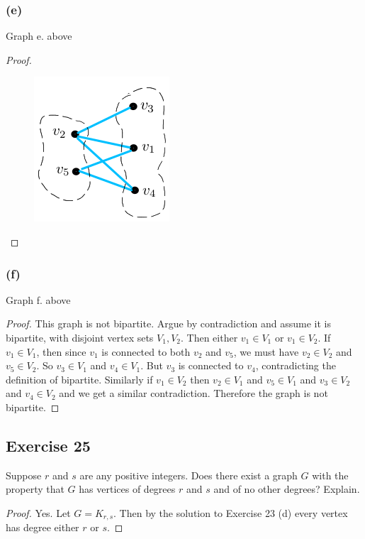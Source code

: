 \documentclass[14pt]{extarticle}
\begin{document}
\subsubsection{(e)}
Graph e. above

\begin{proof}
\begin{figure}[ht!]
\centering
\includegraphics[scale=0.4]{../images/4.9.24.e.png}
\end{figure}
\end{proof}

\subsubsection{(f)}
Graph f. above

\begin{proof}
This graph is not bipartite. Argue by contradiction and assume it is bipartite, with disjoint vertex sets $V_1, V_2$. Then either $v_1 \in V_1$ or $v_1 \in V_2$. If $v_1 \in V_1$, then since $v_1$ is connected to both $v_2$ and $v_5$, we must have $v_2 \in V_2$ and $v_5 \in V_2$. So $v_3 \in V_1$ and $v_4 \in V_1$. But $v_3$ is connected to $v_4$, contradicting the definition of bipartite. Similarly if $v_1 \in V_2$ then $v_2 \in V_1$ and $v_5 \in V_1$ and $v_3 \in V_2$ and $v_4 \in V_2$ and we get a similar contradiction. Therefore the graph is not bipartite.
\end{proof}

\subsection{Exercise 25}
Suppose $r$ and $s$ are any positive integers. Does there exist a graph $G$ with the property that $G$ has vertices of degrees $r$ and $s$ and of no other degrees? Explain.

\begin{proof}
Yes. Let $G = K_{r,s}$. Then by the solution to Exercise 23 (d) every vertex has degree either $r$ or $s$.
\end{proof}
\end{document}
